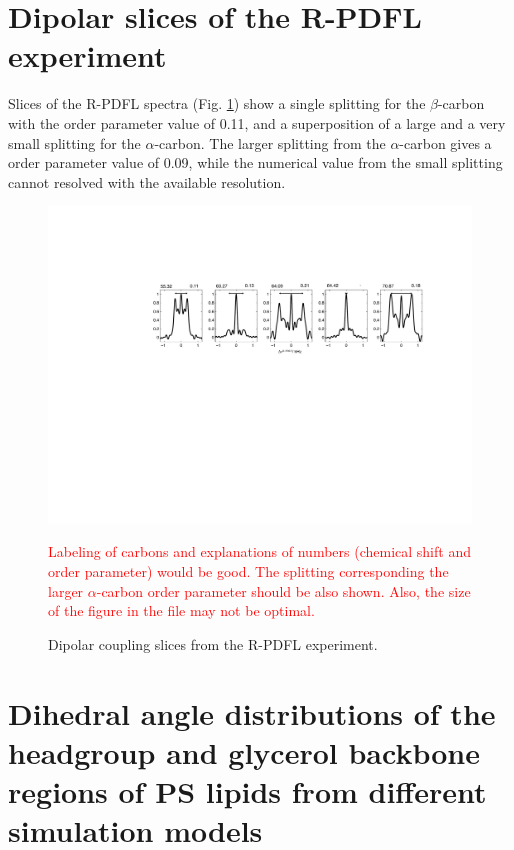 \documentclass[journal=jpcbfk]{achemso}
\newcommand{\todo}[1]{\textcolor{red}{#1}}
\begin{document}
\pagebreak
\section{Dipolar slices of the R-PDFL experiment}

Slices of the R-PDFL spectra (Fig. \ref{DPslices}) 
show a single splitting for the $\beta$-carbon with the order parameter value of 0.11,
and a superposition of a large and a very small splitting for the $\alpha$-carbon.
The larger splitting from the $\alpha$-carbon gives a order parameter value of 0.09, while the numerical value
from the small splitting cannot resolved with the available resolution.
\begin{figure}[]
  \includegraphics[width=20.0cm]{../Figs/SI_slices.pdf}
  \caption{\label{DPslices}
    Dipolar coupling slices from the R-PDFL experiment.
  }
  \todo{Labeling of carbons and explanations of numbers (chemical shift and order parameter) would be good.
    The splitting corresponding the larger $\alpha$-carbon order parameter should be also shown.
  Also, the size of the figure in the file may not be optimal.}
\end{figure}

\pagebreak
\section{Dihedral angle distributions of the headgroup and glycerol backbone
  regions of PS lipids from different simulation models}
\end{document}
